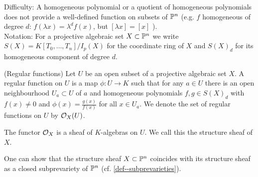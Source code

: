 \documentclass[a4paper,11pt]{article}
\begin{document}
			\noindent Difficulty: A homogeneous polynomial or a quotient of homogeneous polynomials does not provide a well-defined function on subsets of $\P^n$ (e.g. $f$ homogeneous of degree $d$: $f(\lambda x)=\lambda^df(x)$, but $[\lambda x]=[x]$ \contradiction).
			\\

			\noindent Notation: For a projective algebraic set $X\subset\P^n$ we write $S(X)=K[T_0,\dots,T_n]/I_p(X)$ for the coordinate ring of $X$ and $S(X)_d$ for its homogeneous component of degree $d$.

			\begin{defi}(Regular functions)
				Let $U$ be an open subset of a projective algebraic set $X$. A regular function on $U$ is a map $\phi:U\rightarrow K$ such that for any $a\in U$ there is an open neighbourhood $U_a\subset U$ of $a$ and homogeneous polynomials $f,g\in S(X)_d$ with $f(x)\neq0$ and $\phi(x)=\frac{g(x)}{f(x)}$ for all $x\in U_a$. We denote the set of regular functions on $U$ by $\O_X(U)$.
			\end{defi}

			\begin{prop}
				The functor $\O_X$ is a sheaf of $K$-algebras on $U$. We call this the structure sheaf of $X$.
			\end{prop}

			\begin{remark}
				One can show that the structure sheaf $X\subset\P^n$ coincides with its structure sheaf as a closed subprevariety of $\P^n$ (cf. \autoref{def--subprevarieties}).
			\end{remark}
\end{document}
